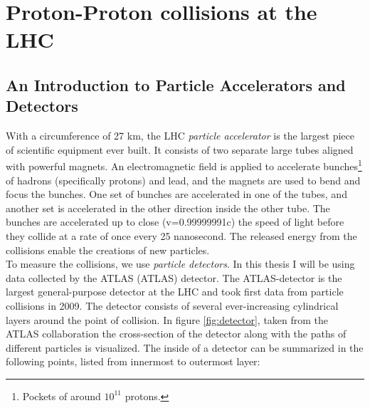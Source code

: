 \section{Proton-Proton collisions at the LHC}
\subsection{An Introduction to Particle Accelerators and Detectors}\label{subsec:Detector}
With a circumference of 27 km, the \ac{LHC} \emph{particle accelerator} is the largest piece of scientific 
equipment ever built. It consists of two separate large tubes aligned with powerful magnets. An electromagnetic field is
applied to accelerate bunches\footnote{Pockets of around $10^{11}$ protons.} of hadrons (specifically protons) and lead,
and the magnets are used to bend and focus the bunches. One set of bunches are accelerated in one of the tubes, 
and another set is accelerated in the other direction inside the other tube. The bunches are accelerated up to close 
(v=0.99999991c) the speed of light before they collide at a rate of once every 25 nanosecond. The released energy from 
the collisions enable the creations of new particles.
\\
To measure the collisions, we use \emph{particle detectors}. In this thesis I will be using data collected by the 
\acs{ATLAS} (\acl{ATLAS}) detector. The \ac{ATLAS}-detector is the largest general-purpose detector at the \ac{LHC}
and took first data from particle collisions in 2009. The detector consists of several ever-increasing cylindrical layers 
around the point of collision. In figure \ref{fig:detector}, taken from the \ac{ATLAS} collaboration \cite{PDetector} the cross-section 
of the detector along with the paths of different particles is visualized. The inside of a detector can be summarized 
in the following points, listed from innermost to outermost layer:

